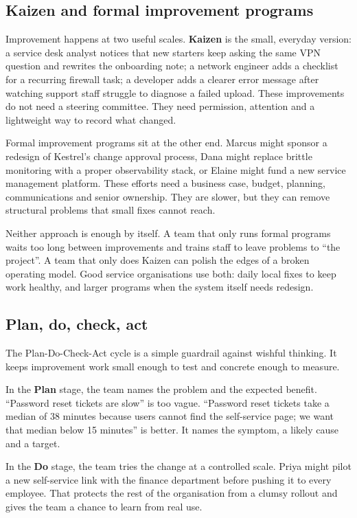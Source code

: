 \subsection{Kaizen and formal improvement programs}


Improvement happens at two useful scales. \textbf{Kaizen} is the small, everyday version: a service desk analyst notices that new starters keep asking the same VPN question and rewrites the onboarding note; a network engineer adds a checklist for a recurring firewall task; a developer adds a clearer error message after watching support staff struggle to diagnose a failed upload. These improvements do not need a steering committee. They need permission, attention and a lightweight way to record what changed.


Formal improvement programs sit at the other end. Marcus might sponsor a redesign of Kestrel's change approval process, Dana might replace brittle monitoring with a proper observability stack, or Elaine might fund a new service management platform. These efforts need a business case, budget, planning, communications and senior ownership. They are slower, but they can remove structural problems that small fixes cannot reach.


Neither approach is enough by itself. A team that only runs formal programs waits too long between improvements and trains staff to leave problems to ``the project''. A team that only does Kaizen can polish the edges of a broken operating model. Good service organisations use both: daily local fixes to keep work healthy, and larger programs when the system itself needs redesign.



\subsection{Plan, do, check, act}


The Plan-Do-Check-Act cycle is a simple guardrail against wishful thinking. It keeps improvement work small enough to test and concrete enough to measure.


In the \textbf{Plan} stage, the team names the problem and the expected benefit. ``Password reset tickets are slow'' is too vague. ``Password reset tickets take a median of 38 minutes because users cannot find the self-service page; we want that median below 15 minutes'' is better. It names the symptom, a likely cause and a target.


In the \textbf{Do} stage, the team tries the change at a controlled scale. Priya might pilot a new self-service link with the finance department before pushing it to every employee. That protects the rest of the organisation from a clumsy rollout and gives the team a chance to learn from real use.


